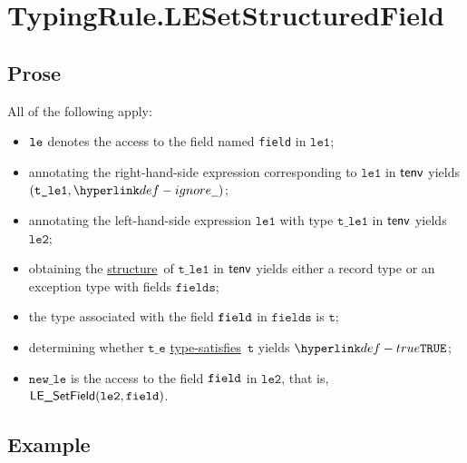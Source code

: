 \documentclass{book}
\newcommand\ProseOrTypeError[0]{\ProseTerminateAs{\TypeErrorConfig}}
\newcommand\structure[0]{\hyperlink{def-structure}{structure}}
\newcommand\typesatisfies[0]{\hyperlink{def-typesatisfies}{type-satisfies}}
\newcommand\vt[0]{\texttt{t}}
\newcommand\vte[0]{\texttt{t\_e}}
\newcommand\vleone[0]{\texttt{le1}}
\newcommand\vletwo[0]{\texttt{le2}}
\newcommand\vtleone[0]{\texttt{t\_le1}}
\newcommand\newle[0]{\texttt{new\_le}}
\newcommand\fields[0]{\texttt{fields}}
\begin{document}

\section{TypingRule.LESetStructuredField \label{sec:TypingRule.LESetStructuredField}}

\subsection{Prose}
All of the following apply:
\begin{itemize}
  \item $\texttt{le}$ denotes the access to the field named \texttt{field} in $\vleone$;
  \item annotating the right-hand-side expression corresponding to $\vleone$ in $\textsf{tenv}$ yields \\ $(\vtleone, \Ignore)$\ProseOrTypeError;
  \item annotating the left-hand-side expression  $\vleone$ with type $\vtleone$ in $\textsf{tenv}$ yields $\vletwo$\ProseOrTypeError;
  \item obtaining the \structure\ of $\vtleone$ in $\textsf{tenv}$ yields either a record type or an exception type with fields $\fields$\ProseOrTypeError;
  \item the type associated with the field $\texttt{field}$ in $\fields$ is $\vt$;
  \item determining whether $\vte$ \typesatisfies\ $\vt$ yields $\True$\ProseOrTypeError;
  \item $\newle$ is the access to the field $\texttt{field}$ in $\vletwo$, that is, $\LESetField(\vletwo, \field)$.
\end{itemize}

\subsection{Example}

\end{document}
